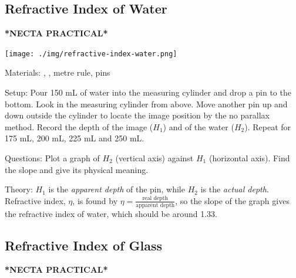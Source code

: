 \begin{multicols}{2}
\subsection{Refractive Index of Water}
\textbf{*NECTA PRACTICAL*}

\begin{center}
\texttt{[image: ./img/refractive-index-water.png]}
\end{center}

\begin{description*}
\item[Materials:]{, , metre rule, pins}
\item[Setup:]{Pour 150 mL of water into the measuring cylinder and drop a pin to the bottom. Look in the measuring cylinder from above. Move another pin up and down outside the cylinder to locate the image position by the no parallax method. Record the depth of the image ($H_1$) and of the water ($H_2$). Repeat for 175 mL, 200 mL, 225 mL and 250 mL.}
\item[Questions:]{Plot a graph of $H_2$ (vertical axis) against $H_1$ (horizontal axis). Find the slope and give its physical meaning.}
\item[Theory:]{$H_1$ is the \emph{apparent depth} of the pin, while $H_2$ is the \emph{actual depth}. Refractive index, $\eta$, is found by $\eta = \frac{\text{real depth}}{\text{apparent depth}}$, so the slope of the graph gives the refractive index of water, which should be around 1.33.}
\end{description*}

\subsection{Refractive Index of Glass} \label{sub:refr-index-glass}
\textbf{*NECTA PRACTICAL*}


\end{multicols}
